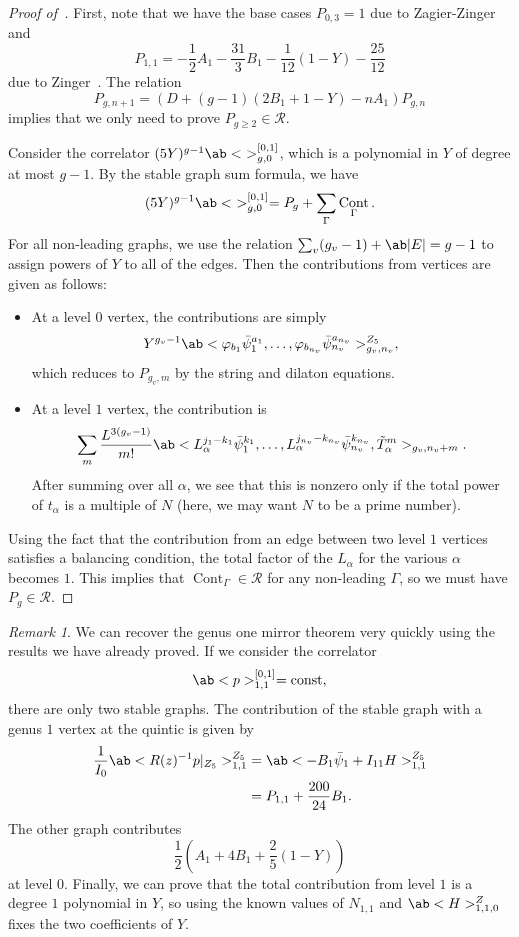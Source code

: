 \documentclass[10pt,oldfontcommands,oneside]{memoir}
\theoremstyle{definition}
\theoremstyle{remark}
\newtheorem{rmk}[thm]{Remark}
\theoremstyle{plain}
\theoremstyle{definition}
\theoremstyle{remark}
\newcommand{\mc}[1]{\mathcal{#1}}
\newcommand{\mr}[1]{\mathrm{#1}}
\newcommand{\1}{\mathbf{1}}
\newcommand{\2}{\mathbf{2}}
\newcommand{\3}{\mathbf{3}}
\DeclareMathOperator{\Cont}{Cont}
\begin{document}
\begin{proof}[Proof of~]
    First, note that we have the base cases $P_{0,3} = 1$ due to Zagier-Zinger~\cite{zagierzinger} and
    \[ P_{1,1} = -\frac{1}{2} A_1 - \frac{31}{3} B_1 - \frac{1}{12} (1-Y) - \frac{25}{12} \]
    due to Zinger~\cite{reducedgenus1}. The relation 
    \[ P_{g,n+1} = (D + (g-1)(2B_1+1-Y) - nA_1) P_{g,n} \]
    implies that we only need to prove $P_{g \geq 2} \in \mc{R}$.

    Consider the correlator $(5Y)^{g-1}\ab<\ >_{g,0}^{[0,1]}$, which is a polynomial in $Y$ of degree at most $g-1$. By the stable graph sum formula, we have
    \[ (5Y)^{g-1}\ab<\ >_{g,0}^{[0,1]} = P_g + \sum_{\Gamma} \Cont_{\Gamma}. \]
    For all non-leading graphs, we use the relation $\sum_v (g_v-1) + \ab|E| = g-1$ to assign powers of $Y$ to all of the edges. Then the contributions from vertices are given as follows:
    \begin{itemize}
        \item At a level $0$ vertex, the contributions are simply
            \[ Y^{g_v-1} \ab<\varphi_{b_1} \bar{\psi}_1^{a_1}, \ldots, \varphi_{b_{n_v}} \bar{\psi}_{n_v}^{a_{n_v}}>^{Z_5}_{g_v, n_v}, \]
            which reduces to $P_{g_v, m}$ by the string and dilaton equations. 
        \item At a level $1$ vertex, the contribution is
            \[ \sum_m \frac{L^{3(g_v-1)}}{m!}\ab<L_{\alpha}^{j_1-k_1}\bar{\psi}_1^{k_1}, \ldots, L_{\alpha}^{j_{n_v} - k_{n_v}} \bar{\psi}_{n_v}^{k_{n_v}}, \tilde{T}_{\alpha}^m>_{g_v, n_v+m}. \]
            After summing over all $\alpha$, we see that this is nonzero only if the total power of $t_{\alpha}$ is a multiple of $N$ (here, we may want $N$ to be a prime number).
    \end{itemize}
    Using the fact that the contribution from an edge between two level $1$ vertices satisfies a balancing condition, the total factor of the $L_{\alpha}$ for the various $\alpha$ becomes $1$. This implies that $\Cont_{\Gamma} \in \mc{R}$ for any non-leading $\Gamma$, so we must have $P_g \in \mc{R}$.
\end{proof}

\begin{rmk}
    We can recover the genus one mirror theorem very quickly using the results we have already proved. If we consider the correlator
    \[ \ab<p>_{1,1}^{[0,1]} = \mr{const}, \]
    there are only two stable graphs. The contribution of the stable graph with a genus $1$ vertex at the quintic is given by
    \begin{align*}
        \frac{1}{I_0}\ab<R(z)^{-1}p|_{Z_5}>^{Z_5}_{1,1} &= \ab<-B_1\bar{\psi}_1 + I_{11}H>^{Z_5}_{1,1} \\
        &= P_{1,1} + \frac{200}{24} B_1.
    \end{align*}
    The other graph contributes
    \[ \frac{1}{2}(A_1+4B_1 + \frac{2}{5}(1-Y)) \]
    at level $0$. Finally, we can prove that the total contribution from level $1$ is a degree $1$ polynomial in $Y$, so using the known values of $N_{1,1}$ and $\ab<H>^Z_{1,1,0}$ fixes the two coefficients of $Y$.
\end{rmk}
\end{document}
